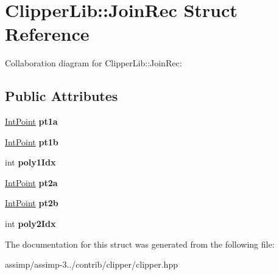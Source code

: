 \hypertarget{struct_clipper_lib_1_1_join_rec}{\section{Clipper\+Lib\+:\+:Join\+Rec Struct Reference}
\label{struct_clipper_lib_1_1_join_rec}
}


Collaboration diagram for Clipper\+Lib\+:\+:Join\+Rec\+:
\subsection*{Public Attributes}
\begin{DoxyCompactItemize}
\item 
\hypertarget{struct_clipper_lib_1_1_join_rec_a6104df321499a54dae6886f4c9e1f081}{\hyperlink{struct_clipper_lib_1_1_int_point}{Int\+Point} {\bfseries pt1a}}\label{struct_clipper_lib_1_1_join_rec_a6104df321499a54dae6886f4c9e1f081}

\item 
\hypertarget{struct_clipper_lib_1_1_join_rec_a4f2b81b4c5b3d7a318b336ae5a79bfbe}{\hyperlink{struct_clipper_lib_1_1_int_point}{Int\+Point} {\bfseries pt1b}}\label{struct_clipper_lib_1_1_join_rec_a4f2b81b4c5b3d7a318b336ae5a79bfbe}

\item 
\hypertarget{struct_clipper_lib_1_1_join_rec_a0182940405f04806ea1e946bf89deebf}{int {\bfseries poly1\+Idx}}\label{struct_clipper_lib_1_1_join_rec_a0182940405f04806ea1e946bf89deebf}

\item 
\hypertarget{struct_clipper_lib_1_1_join_rec_aed147cfa6dda75afeb0545ff8a58e28a}{\hyperlink{struct_clipper_lib_1_1_int_point}{Int\+Point} {\bfseries pt2a}}\label{struct_clipper_lib_1_1_join_rec_aed147cfa6dda75afeb0545ff8a58e28a}

\item 
\hypertarget{struct_clipper_lib_1_1_join_rec_a97e2949cf90e737e96e93fde982421d0}{\hyperlink{struct_clipper_lib_1_1_int_point}{Int\+Point} {\bfseries pt2b}}\label{struct_clipper_lib_1_1_join_rec_a97e2949cf90e737e96e93fde982421d0}

\item 
\hypertarget{struct_clipper_lib_1_1_join_rec_a0ee034c5ff30c40182e8bd399df38a7f}{int {\bfseries poly2\+Idx}}\label{struct_clipper_lib_1_1_join_rec_a0ee034c5ff30c40182e8bd399df38a7f}

\end{DoxyCompactItemize}


The documentation for this struct was generated from the following file\+:\begin{DoxyCompactItemize}
\item 
assimp/assimp-\/3../contrib/clipper/clipper.\+hpp\end{DoxyCompactItemize}
